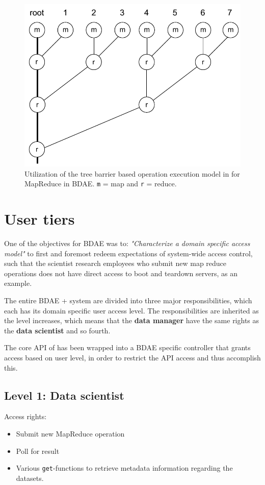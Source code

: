 \begin{figure}
	\centering
	\includegraphics[scale=0.7]{pdf/map-reduce-tree.pdf}
	\caption[BDAE MapReduce implementation]{Utilization of the tree barrier based operation execution model in \CodeName for MapReduce in BDAE. \texttt{m} = map and \texttt{r} = reduce. \label{fig:map-reduce-tree}}
\end{figure}	

\section{User tiers} \label{sec:user-tiers}
One of the objectives for BDAE was to: \textit{"Characterize a domain specific access model"} to first and foremost redeem expectations of system-wide access control, such that the scientist research employees who submit new map reduce operations does not have direct access to boot and teardown servers, as an example.
\newline

The entire BDAE + \CodeName system are divided into three major responsibilities, which each has its domain specific user access level. The responsibilities are inherited as the level increases, which means that the \textbf{data manager} have the same rights as the \textbf{data scientist} and so fourth.
\newline

The core API of \CodeName has been wrapped into a BDAE specific controller that grants access based on user level, in order to restrict the API access and thus accomplish this.

\subsection{Level 1: Data scientist}
Access rights:
\begin{itemize}
	\item Submit new MapReduce operation
	\item Poll for result
	\item Various \texttt{get}-functions to retrieve metadata information regarding the datasets.
\end{itemize}

